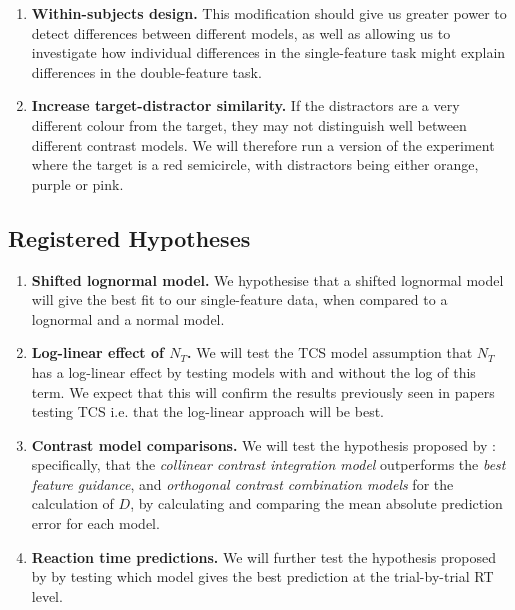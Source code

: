 \documentclass[preprint,12pt,authoryear]{elsarticle}
\begin{document}
\begin{enumerate}
\item \textbf{Within-subjects design.} This modification should give us greater power to detect differences between different models, as well as allowing us to investigate how individual differences in the single-feature task might explain differences in the double-feature task.
\\
\item \textbf{Increase target-distractor similarity.}  If the distractors are a very different colour from the target, they may not distinguish well between different contrast models. We will therefore run a version of the experiment where the target is a red semicircle, with distractors being either orange, purple or pink.
\\
\end{enumerate}

\subsection{Registered Hypotheses}

\begin{enumerate}
\item \textbf{Shifted lognormal model.} We hypothesise that a shifted lognormal model will give the best fit to our single-feature data, when compared to a lognormal and a normal model. \\
\item \textbf{Log-linear effect of $N_T$.} We will test the TCS model assumption that $N_T$ has a log-linear effect by testing models with and without the log of this term. We expect that this will confirm the results previously seen in papers testing TCS i.e. that the log-linear approach will be best.\\ 
\item \textbf{Contrast model comparisons.} We will test the hypothesis proposed by \citep{buetti2019predicting}: specifically, that the \textit{collinear contrast integration model} outperforms the \textit{best feature guidance}, and \textit{orthogonal contrast combination models} for the calculation of $D$, by calculating and comparing the mean absolute prediction error for each model. \\
\item \textbf{Reaction time predictions.} We will further test the hypothesis proposed by \citep{buetti2019predicting} by testing which model gives the best prediction at the trial-by-trial RT level.
\end{enumerate}
\end{document}
